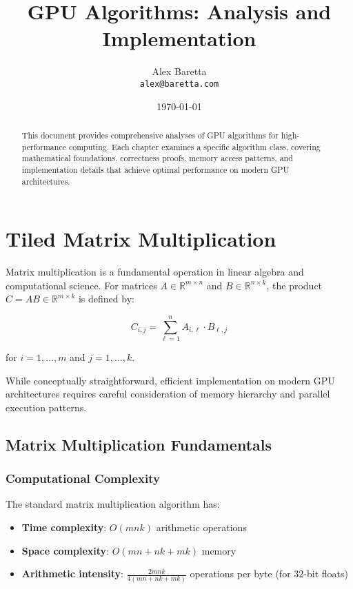 \documentclass{amsbook}
\title{GPU Algorithms: Analysis and Implementation}
\author{Alex Baretta \\
        \texttt{alex@baretta.com}}
\date{\today}
\theoremstyle{definition}
\begin{document}
\begin{abstract}
This document provides comprehensive analyses of GPU algorithms for high-performance computing. Each chapter examines a specific algorithm class, covering mathematical foundations, correctness proofs, memory access patterns, and implementation details that achieve optimal performance on modern GPU architectures.
\end{abstract}

\maketitle

\tableofcontents


\chapter{Tiled Matrix Multiplication}

Matrix multiplication is a fundamental operation in linear algebra and computational science. For matrices $A \in \mathbb{R}^{m \times n}$ and $B \in \mathbb{R}^{n \times k}$, the product $C = AB \in \mathbb{R}^{m \times k}$ is defined by:

\begin{equation}
C_{i,j} = \sum_{\ell=1}^{n} A_{i,\ell} \cdot B_{\ell,j}
\end{equation}

for $i = 1, \ldots, m$ and $j = 1, \ldots, k$.

While conceptually straightforward, efficient implementation on modern GPU architectures requires careful consideration of memory hierarchy and parallel execution patterns.

\section{Matrix Multiplication Fundamentals}

\subsection{Computational Complexity}

The standard matrix multiplication algorithm has:
\begin{itemize}
\item \textbf{Time complexity}: $O(mnk)$ arithmetic operations
\item \textbf{Space complexity}: $O(mn + nk + mk)$ memory
\item \textbf{Arithmetic intensity}: $\frac{2mnk}{4(mn + nk + mk)}$ operations per byte (for 32-bit floats)
\end{itemize}
\end{document}
